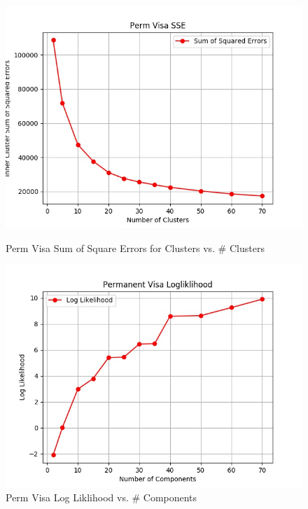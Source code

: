 \documentclass[h]{article}
\begin{document}
 \begin{figure}[H]
      \includegraphics[width=1\textwidth,keepaspectratio]{perm_visa_sse.jpg} 
      \caption*{Perm Visa Sum of Square Errors for Clusters vs. \# Clusters} 
   \endminipage\hfill
      \includegraphics[width=1\textwidth,keepaspectratio]{permanent_visa_logliklihood.jpg} 
      \caption*{Perm Visa Log Liklihood vs. \# Components} 
   \endminipage\hfill

\end{figure}
\end{document}
